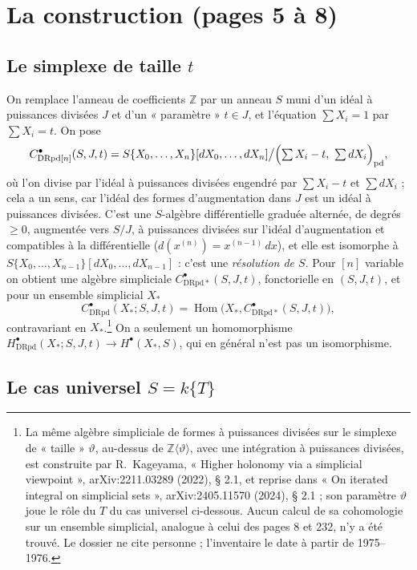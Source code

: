 \documentclass[11pt,a4paper]{article}
\begin{document}
\section*{La construction (pages 5 à 8)}

\subsection*{Le simplexe de taille $t$}

On remplace l'anneau de coefficients $\mathbb{Z}$ par un anneau $S$ muni d'un
idéal à puissances divisées $J$ et d'un « paramètre » $t \in J$, et l'équation
$\sum X_i = 1$ par $\sum X_i = t$. On pose
\[
C^\bullet_{\mathrm{DRpd}[n]}(S, J, t) = S\{X_0, \ldots, X_n\}[dX_0, \ldots, dX_n] \big/ \Bigl(\textstyle\sum X_i - t,\ \sum dX_i\Bigr)_{\mathrm{pd}} ,
\]
où l'on divise par l'idéal à puissances divisées engendré par
$\sum X_i - t$ et $\sum dX_i$ ; cela a un sens, car l'idéal des formes
d'augmentation dans $J$ est un idéal à puissances divisées. C'est une
$S$-algèbre différentielle graduée alternée, de degrés $\geq 0$, augmentée vers
$S/J$, à puissances divisées sur l'idéal d'augmentation et compatibles à la
différentielle ($d(x^{(n)}) = x^{(n-1)}\,dx$), et elle est isomorphe à
$S\{X_0, \ldots, X_{n-1}\}[dX_0, \ldots, dX_{n-1}]$ : c'est une
\emph{résolution de $S$}. Pour $[n]$ variable on obtient une algèbre
simpliciale $C^\bullet_{\mathrm{DRpd}*}(S,J,t)$, fonctorielle en $(S,J,t)$, et
pour un ensemble simplicial $X_*$
\[
C^\bullet_{\mathrm{DRpd}}(X_*; S, J, t) = \operatorname{Hom}\bigl(X_*, C^\bullet_{\mathrm{DRpd}*}(S,J,t)\bigr) ,
\]
contravariant en $X_*$.\footnote{La même algèbre simpliciale de formes à
puissances divisées sur le simplexe de « taille » $\vartheta$, au-dessus de
$\mathbb{Z}\langle\vartheta\rangle$, avec une intégration à puissances
divisées, est construite par R.~Kageyama, « Higher holonomy via a simplicial
viewpoint », arXiv:2211.03289 (2022), § 2.1, et reprise dans « On iterated
integral on simplicial sets », arXiv:2405.11570 (2024), § 2.1 ; son paramètre
$\vartheta$ joue le rôle du $T$ du cas universel ci-dessous. Aucun calcul de
sa cohomologie sur un ensemble simplicial, analogue à celui des pages 8 et
232, n'y a été trouvé. Le dossier ne cite personne ; l'inventaire le date à
partir de 1975--1976.} On a seulement un homomorphisme
$H^\bullet_{\mathrm{DRpd}}(X_*; S,J,t) \to H^\bullet(X_*, S)$, qui en général
n'est pas un isomorphisme.

\subsection*{Le cas universel $S = k\{T\}$}
\end{document}
